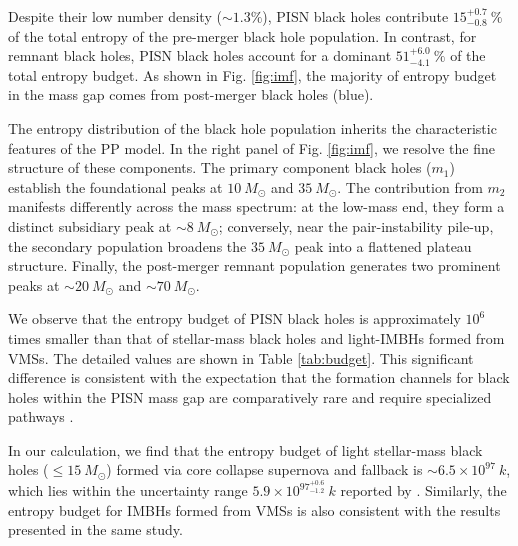 \documentclass[twocolumn]{aastex631}
\begin{document}
Despite their low number density ($\sim 1.3\%$), PISN black holes contribute $15^{+0.7}_{-0.8}~\%$ of the total entropy of the pre-merger black hole population. In contrast, for remnant black holes, PISN black holes account for a dominant $51^{+6.0}_{-4.1}~\%$ of the total entropy budget. As shown in Fig. \ref{fig:imf}, the majority of entropy budget in the mass gap comes from post-merger black holes (blue).

The entropy distribution of the black hole population inherits the characteristic features of the PP model. In the right panel of Fig. \ref{fig:imf}, we resolve the fine structure of these components. The primary component black holes ($m_1$) establish the foundational peaks at $10~M_\odot$ and $35~M_\odot$. The contribution from $m_2$ manifests differently across the mass spectrum: at the low-mass end, they form a distinct subsidiary peak at $\sim 8~M_\odot$; conversely, near the pair-instability pile-up, the secondary population broadens the $35~M_\odot$ peak into a flattened plateau structure. Finally, the post-merger remnant population generates two prominent peaks at $\sim20~M_\odot$ and $\sim 70~M_\odot$.

We observe that the entropy budget of PISN black holes is approximately $10^6$ times smaller than that of stellar-mass black holes and light-IMBHs formed from VMSs. The detailed values are shown in Table \ref{tab:budget}. This significant difference is consistent with the expectation that the formation channels for black holes within the PISN mass gap are comparatively rare and require specialized pathways \citep{Costa_2022, Karathanasis_2023, chen2024distinguishingdemographicscompactbinaries}. 

In our calculation, we find that the entropy budget of light stellar-mass black holes ($\leq 15~M_\odot$) formed via core collapse supernova and fallback is $\sim 6.5 \times 10^{97}~k$, which lies within the uncertainty range $5.9 \times 10^{{97}^{+0.6}_{-1.2}}~k$ reported by \cite{Egan_2010}. Similarly, the entropy budget for IMBHs formed from VMSs is also consistent with the results presented in the same study.
\end{document}

